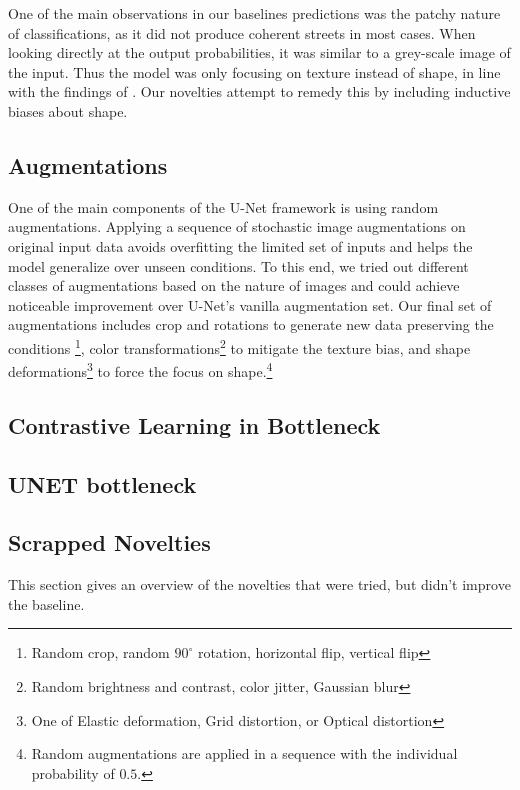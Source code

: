 One of the main observations in our baselines predictions was the patchy nature of classifications, as it did not produce coherent streets in most cases. When looking directly at the output probabilities, it was similar to a grey-scale image of the input. Thus the model was only focusing on texture instead of shape, in line with the findings of \cite{baker2018deep}. Our novelties attempt to remedy this by including inductive biases about shape.

\subsection{Augmentations}
One of the main components of the U-Net framework is using random augmentations. Applying a sequence of stochastic image augmentations on original input data avoids overfitting the limited set of inputs and helps the model generalize over unseen conditions. To this end, we tried out different classes of augmentations based on the nature of images and could achieve noticeable improvement over U-Net's vanilla augmentation set. Our final set of augmentations includes crop and rotations to generate new data preserving the conditions \footnote{Random crop,  random $90^{\circ}$ rotation, horizontal flip, vertical flip}, color transformations\footnote{Random brightness and contrast, color jitter, Gaussian blur} to mitigate the texture bias, and shape deformations\footnote{One of Elastic deformation, Grid distortion, or Optical distortion} to force the focus on shape.\footnote{Random augmentations are applied in a sequence with the individual probability of $0.5$.}

\subsection{Contrastive Learning in Bottleneck}

\subsection{UNET bottleneck}


\subsection{Scrapped Novelties}
    This section gives an overview of the novelties that were tried, but didn't improve the baseline.
    
